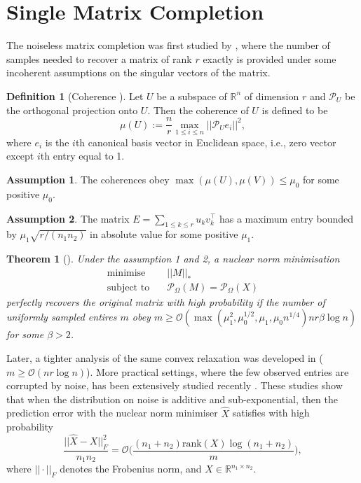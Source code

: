 \documentclass{article} %
\newtheorem{theorem}{Theorem}
\theoremstyle{definition}
\newtheorem{definition}{Definition}
\newtheorem{assumption}{Assumption}
\newcommand\mc{\mathcal} %
\begin{document}
\section{Single Matrix Completion}
The noiseless matrix completion was first studied by \cite{candes2009exact}, where the number of samples needed to recover a matrix of rank $r$ exactly is provided under some incoherent assumptions on the singular vectors of the matrix.
\begin{definition}[Coherence \cite{candes2009exact}]
Let $U$ be a subspace of $\mathbb{R}^n$ of dimension $r$ and $\mc{P}_U$ be the orthogonal projection onto $U$. Then the coherence of $U$ is defined to be
\begin{equation}
\mu(U) := \frac{n}{r}\max_{1\leq i \leq n}||\mc{P}_Ue_i||^2,
\end{equation}
where $e_i$ is the $i$th canonical basis vector in Euclidean space, i.e., zero vector except $i$th entry equal to 1.
\end{definition}

\begin{assumption}
The coherences obey $\max(\mu(U),\mu(V)) \leq \mu_0$ for some positive $\mu_0$.
\end{assumption}
\begin{assumption}
The matrix $E=\sum_{1\leq k \leq r} u_k v_k^\top$ has a maximum entry bounded by $\mu_1 \sqrt{r/(n_1n_2)}$ in absolute value for some positive $\mu_1$.
\end{assumption}

\begin{theorem}[\cite{candes2009exact}]
Under the assumption 1 and 2, a nuclear norm minimisation
\begin{align}
\text{minimise}&\quad ||M||_* \\
\text{subject to}&\quad \mc{P}_{\Omega}(M) = \mc{P}_{\Omega}(X) 
\end{align}
perfectly recovers the original matrix with high probability if the number of uniformly sampled entires $m$ obey $m\geq \mathcal{O}(\max(\mu_1^2,\mu_0^{1/2},\mu_1,\mu_0n^{1/4}) n r \beta \log n)$ for some $\beta > 2$.
\end{theorem}
Later, a tighter analysis of the same convex relaxation was developed in \cite{candes2010power} ($m \geq \mathcal{O}(n r \log n)$). More practical settings, where the few observed entries are corrupted by noise, has been extensively studied recently \cite{candes2010matrix,keshavan2010matrix,negahban2012restricted,klopp2014noisy,lafond2015low}. These studies show that when the distribution on noise is additive and sub-exponential, then the prediction error with the nuclear norm minimiser $\hat{X}$ satisfies with high probability
\begin{equation}
\frac{||\hat{X} - X||^2_{F}}{n_1 n_2} = \mathcal{O}\bigg(
\frac{(n_1+n_2) \text{rank}(X) \log (n_1 + n_2)}{m}
\bigg),
\end{equation}
where $||\cdot||_F$ denotes the Frobenius norm, and $X\in\mathbb{R}^{n_1 \times n_2}$.
\end{document}
